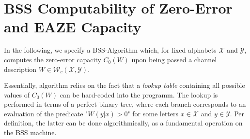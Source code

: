 \documentclass[conference]{IEEEtran}
\def\X{{\mathcal X}}
\def\Y{{\mathcal Y}}
\def\W{{\mathcal W}}
\begin{document}
\section{BSS Computability of Zero-Error and EAZE Capacity}\label{State}
	In the following, we specify a BSS-Algorithm which, for fixed alphabets \(\X\) and \(\Y\), computes the zero-error capacity \(C_0(W)\) upon being passed a channel description \(W \in \W_c(\X,\Y)\). 

	Essentially, algorithm relies on the fact that a \emph{lookup table} containing all possible values of \(C_0(W)\) can be hard-coded into the programm. The lookup is performed in 
	terms of a perfect binary tree, where each branch corresponds to an evaluation of the predicate "\(W(y|x) > 0\)" for some letters \(x\in\X\) and \(y\in\Y\). Per definition, the latter 
	can be done algorithmically, as a fundamental operation on the BSS machine.
\end{document}
